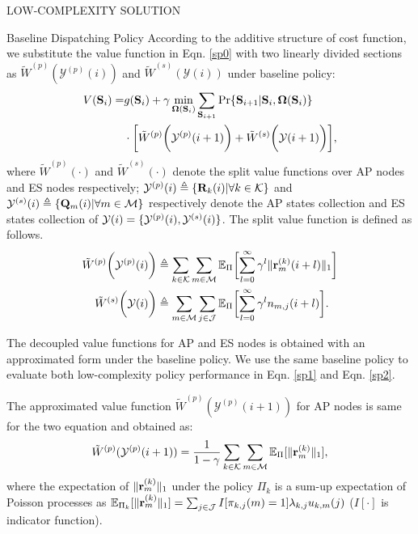 \documentclass[10pt, conference, letterpaper]{IEEEtran}
\newcommand{\mat}{\mathbf}
\newcommand{\define}{\triangleq}
\renewcommand{\vec}{\mathbf}
\DeclarePairedDelimiter{\set}{\{}{\}}
\DeclarePairedDelimiter{\Inorm}{\|}{\|_1}
\DeclarePairedDelimiter{\Paren}{\bigg(}{\bigg)}
\DeclarePairedDelimiter{\Bracket}{\bigg[}{\bigg]}
\newcommand{\apSet}{\mathcal{K}}
\newcommand{\esSet}{\mathcal{M}}
\newcommand{\jSpace}{\mathcal{J}}
\newcommand{\Stat}{\mathbf{S}}
\newcommand{\Obsv}{\mathcal{Y}}
\newcommand{\Policy}{\boldsymbol{\Omega}}
\newcommand{\BPolicy}{\Policy} %
\begin{document}
\begin{section}{LOW-COMPLEXITY SOLUTION}
\begin{subsection}{Baseline Dispatching Policy}
            According to the additive structure of cost function, we substitute the value function in Eqn. \ref{sp0} with two linearly divided sections as $\tilde{W}^{(p)}(\Obsv^{(p)}(i))$ and $\tilde{W}^{(s)}(\Obsv(i))$ under baseline policy:
            \begin{align}
                V(\Stat_{i}) =& 
                    g(\Stat_{i}) + \gamma \min_{\BPolicy(\Stat_{i})} \sum_{\Stat_{i+1}} \Pr\{ \Stat_{i+1}|\Stat_{i}, \BPolicy(\Stat_{i}) \}
                    \nonumber\\
                    & \cdot \Bracket{ \tilde{W}^{(p)}\Paren{\Obsv^{(p)}(i+1)} + \tilde{W}^{(s)}\Paren{\Obsv(i+1)} },
            \end{align}
            where $\tilde{W}^{(p)}(\cdot)$ and $\tilde{W}^{(s)}(\cdot)$ denote the split value functions over AP nodes and ES nodes respectively; $\Obsv^{(p)}(i) \define \set{\mat{R}_k(i)|\forall k\in\apSet}$ and $\Obsv^{(s)}(i) \define \set{\vec{Q}_m(i)|\forall m\in\esSet}$ respectively denote the AP states collection and ES states collection of $\Obsv(i) = \set{\Obsv^{(p)}(i), \Obsv^{(s)}(i)}$. The split value function is defined as follows.
            \begin{align}
                \tilde{W}^{(p)}\Paren{\Obsv^{(p)}(i)} &\define \sum_{k\in\apSet}\sum_{m\in\esSet}
                    \mathbb{E}_{\Pi}\Bracket{
                        \sum_{l=0}^{\infty} \gamma^{l} \Inorm{\vec{r}^{(k)}_{m}(i+l)}
                    }
                \\
                \tilde{W}^{(s)}\Paren{\Obsv(i)} &\define \sum_{m\in\esSet}\sum_{j\in\jSpace}
                    \mathbb{E}_{\Pi}\Bracket{
                        \sum_{l=0}^{\infty} \gamma^{l} n_{m,j}(i+l)
                    }.
            \end{align}
            
            The decoupled value functions for AP and ES nodes is obtained with an approximated form under the baseline policy. We use the same baseline policy to evaluate both low-complexity policy performance in Eqn. \ref{sp1} and Eqn. \ref{sp2}.
            
            The approximated value function $\tilde{W}^{(p)}(\Obsv^{(p)}(i+1))$ for AP nodes is same for the two equation and obtained as:
            \begin{align}
                \tilde{W}^{(p)}(\Obsv^{(p)}(i+1)) = \frac{1}{1-\gamma}
                    \sum_{k\in\apSet}\sum_{m\in\esSet} \mathbb{E}_{\Pi}[\Inorm{\vec{r}^{(k)}_{m}}],
            \end{align}
            where the expectation of $\Inorm{\vec{r}^{(k)}_{m}}$ under the policy $\Pi_k$ is a sum-up expectation of Poisson processes as $\mathbb{E}_{\Pi_k}[\Inorm{\vec{r}^{(k)}_{m}}] = \sum_{j\in\jSpace} I[\pi_{k,j}(m)=1] \lambda_{k,j} u_{k,m}(j)$ ($I[\cdot]$ is indicator function).
            

\end{subsection}
\end{section}
\end{document}
